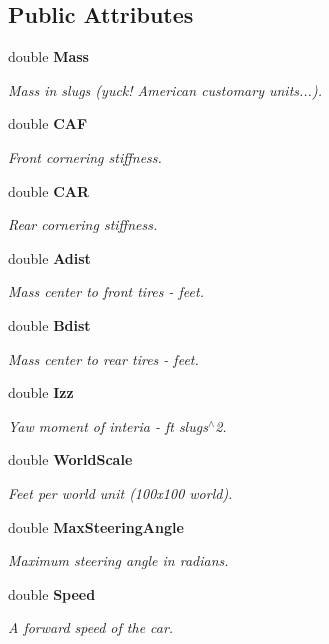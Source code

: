 \subsection*{Public Attributes}
\begin{CompactItemize}
\item 
double {\bf Mass}
\begin{CompactList}\small\item\em Mass in slugs (yuck! American customary units...).\item\end{CompactList}\item 
double {\bf CAF}
\begin{CompactList}\small\item\em Front cornering stiffness.\item\end{CompactList}\item 
double {\bf CAR}
\begin{CompactList}\small\item\em Rear cornering stiffness.\item\end{CompactList}\item 
double {\bf Adist}
\begin{CompactList}\small\item\em Mass center to front tires - feet.\item\end{CompactList}\item 
double {\bf Bdist}
\begin{CompactList}\small\item\em Mass center to rear tires - feet.\item\end{CompactList}\item 
double {\bf Izz}
\begin{CompactList}\small\item\em Yaw moment of interia - ft slugs$^\wedge$2.\item\end{CompactList}\item 
double {\bf World\-Scale}
\begin{CompactList}\small\item\em Feet per world unit (100x100 world).\item\end{CompactList}\item 
double {\bf Max\-Steering\-Angle}
\begin{CompactList}\small\item\em Maximum steering angle in radians.\item\end{CompactList}\item 
double {\bf Speed}
\begin{CompactList}\small\item\em A forward speed of the car.\item\end{CompactList}\end{CompactItemize}


